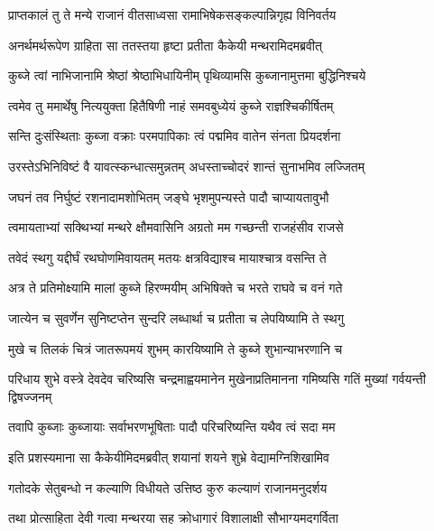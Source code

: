 \twolineshloka
{प्राप्तकालं तु ते मन्ये राजानं वीतसाध्वसा}
{रामाभिषेकसङ्कल्पान्निगृह्य विनिवर्तय} %

\twolineshloka
{अनर्थमर्थरूपेण ग्राहिता सा ततस्तया}
{हृष्टा प्रतीता कैकेयी मन्थरामिदमब्रवीत्} %

\twolineshloka
{कुब्जे त्वां नाभिजानामि श्रेष्ठां श्रेष्ठाभिधायिनीम्}
{पृथिव्यामसि कुब्जानामुत्तमा बुद्धिनिश्चये} %

\twolineshloka
{त्वमेव तु ममार्थेषु नित्ययुक्ता हितैषिणी}
{नाहं समवबुध्येयं कुब्जे राज्ञश्चिकीर्षितम्} %

\twolineshloka
{सन्ति दुःसंस्थिताः कुब्जा वक्राः परमपापिकाः}
{त्वं पद्ममिव वातेन संनता प्रियदर्शना} %

\twolineshloka
{उरस्तेऽभिनिविष्टं वै यावत्स्कन्धात्समुन्नतम्}
{अधस्ताच्चोदरं शान्तं सुनाभमिव लज्जितम्} %

\twolineshloka
{जघनं तव निर्घुष्टं रशनादामशोभितम्}
{जङ्घे भृशमुपन्यस्ते पादौ चाप्यायतावुभौ} %

\twolineshloka
{त्वमायताभ्यां सक्थिभ्यां मन्थरे क्षौमवासिनि}
{अग्रतो मम गच्छन्ती राजहंसीव राजसे} %

\twolineshloka
{तवेदं स्थगु यद्दीर्घं रथघोणमिवायतम्}
{मतयः क्षत्रविद्याश्च मायाश्चात्र वसन्ति ते} %

\twolineshloka
{अत्र ते प्रतिमोक्ष्यामि मालां कुब्जे हिरण्मयीम्}
{अभिषिक्ते च भरते राघवे च वनं गते} %

\twolineshloka
{जात्येन च सुवर्णेन सुनिष्टप्तेन सुन्दरि}
{लब्धार्था च प्रतीता च लेपयिष्यामि ते स्थगु} %

\twolineshloka
{मुखे च तिलकं चित्रं जातरूपमयं शुभम्}
{कारयिष्यामि ते कुब्जे शुभान्याभरणानि च} %

\threelineshloka
{परिधाय शुभे वस्त्रे देवदेव चरिष्यसि}
{चन्द्रमाह्वयमानेन मुखेनाप्रतिमानना}
{गमिष्यसि गतिं मुख्यां गर्वयन्ती द्विषज्जनम्} %

\twolineshloka
{तवापि कुब्जाः कुब्जायाः सर्वाभरणभूषिताः}
{पादौ परिचरिष्यन्ति यथैव त्वं सदा मम} %

\twolineshloka
{इति प्रशस्यमाना सा कैकेयीमिदमब्रवीत्}
{शयानां शयने शुभ्रे वेद्यामग्निशिखामिव} %

\twolineshloka
{गतोदके सेतुबन्धो न कल्याणि विधीयते}
{उत्तिष्ठ कुरु कल्याणं राजानमनुदर्शय} %

\twolineshloka
{तथा प्रोत्साहिता देवी गत्वा मन्थरया सह}
{क्रोधागारं विशालाक्षी सौभाग्यमदगर्विता} %

